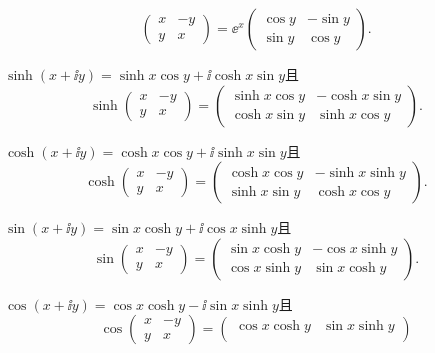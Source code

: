 \begin{mybox}
\begin{problem}
\begin{enum}
\[{\begin{pmatrix}
            x & -y \\
            y & x
          \end{pmatrix}} = \ee^x \begin{pmatrix}
            \cos y & -\sin y \\
            \sin y & \cos y
          \end{pmatrix}.
        \]
    \item $\sinh(x+\ii y)=\sinh x\cos y+\ii\cosh x\sin y$且
        \[
          \sinh \begin{pmatrix}
            x & -y \\
            y & x
          \end{pmatrix} = \begin{pmatrix}
            \sinh x\cos y & -\cosh x\sin y\\
            \cosh x\sin y & \sinh x \cos y
          \end{pmatrix}.
        \]
    \item $\cosh(x+\ii y)=\cosh x\cos y+\ii\sinh x\sin y$且
        \[
          \cosh \begin{pmatrix}
            x & -y \\
            y & x
          \end{pmatrix} = \begin{pmatrix}
            \cosh x\cos y & -\sinh x \sinh y \\
            \sinh x\sin y & \cosh x\cos y
          \end{pmatrix}.
        \]
    \item $\sin(x+\ii y)=\sin x\cosh y+\ii \cos x\sinh y$且
        \[
          \sin \begin{pmatrix}
            x & -y \\
            y & x
          \end{pmatrix} = \begin{pmatrix}
            \sin x\cosh y & -\cos x\sinh y \\
            \cos x\sinh y & \sin x\cosh y
          \end{pmatrix}.
        \]
    \item $\cos(x+\ii y)=\cos x\cosh y-\ii\sin x\sinh y$且
        \[
          \cos \begin{pmatrix}
            x & -y \\
            y & x
          \end{pmatrix} = \begin{pmatrix}
            \cos x\cosh y & \sin x \sinh y \\

\end{pmatrix}\]
\end{enum}
\end{problem}
\end{mybox}
